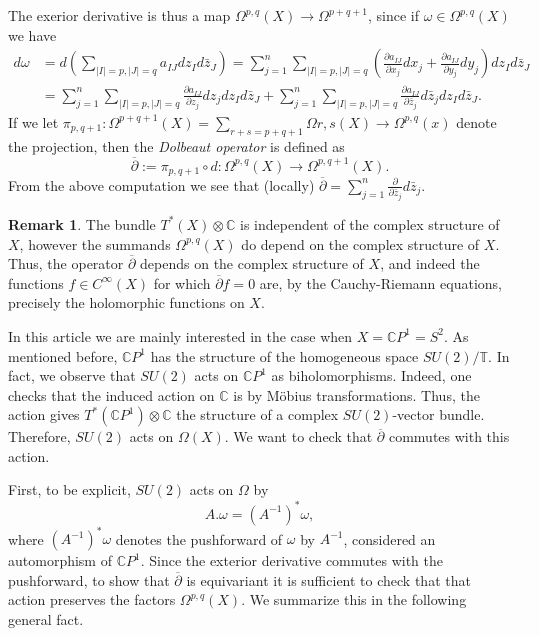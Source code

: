 \documentclass[12pt]{article}
\theoremstyle{definition}
\newtheorem*{rem}{Remark}
\newcommand{\C}{\mathbb{C}}
\newcommand{\T}{\mathbb{T}}
\newcommand{\dolb}{\overline{\partial}}
\begin{document}
The exerior derivative is thus a map $\Omega^{p,q}(X) \to \Omega^{p+q+1}$, since if $\omega \in \Omega^{p,q}(X)$ we have 
	\begin{align*}
		d\omega & = d\left(\sum_{|I|=p, |J|=q}a_{IJ}dz_Id\bar{z}_J\right) = \sum_{j=1}^n\sum_{|I|=p, |J|=q}\left(\frac{\partial a_{IJ}}{\partial x_j}dx_j+\frac{\partial a_{IJ}}{\partial y_j}dy_j\right)dz_Id\bar{z}_J \\
		& = \sum_{j=1}^n\sum_{|I|=p, |J|=q}\frac{\partial a_{IJ}}{\partial z_j}dz_jdz_Id\bar{z}_J+\sum_{j=1}^n\sum_{|I|=p, |J|=q}\frac{\partial a_{IJ}}{\partial \bar{z}_j}d\bar{z}_jdz_Id\bar{z}_J.
	\end{align*}
If we let $\pi_{p,q+1}:\Omega^{p+q+1}(X) = \sum_{r+s=p+q+1}\Omega{r,s}(X)\to \Omega^{p,q}(x)$ denote the projection, then the \textit{Dolbeaut operator} is defined as 
	\[\dolb:= \pi_{p,q+1}\circ d : \Omega^{p,q}(X) \to \Omega^{p,q+1}(X). \]
From the above computation we see that (locally) $\dolb = \sum_{j=1}^n\frac{\partial}{\partial\bar{z}_j}d\bar{z}_j$.

\begin{rem}
	The bundle $T^*(X)\otimes \C$ is independent of the complex structure of $X$, however the summands $\Omega^{p,q}(X)$ do depend on the complex structure of $X$. Thus, the operator $\dolb$ depends on the complex structure of $X$, and indeed the functions $f\in C^\infty(X)$ for which $\dolb f = 0$ are, by the Cauchy-Riemann equations, precisely the holomorphic functions on $X$. 
\end{rem}

In this article we are mainly interested in the case when $X=\C P^1 = S^2$. As mentioned before, $\C P^1$ has the structure of the homogeneous space $SU(2)/\T$. In fact, we observe that $SU(2)$ acts on $\C P^1$ as biholomorphisms. Indeed, one checks that the induced action on $\C$ is by M\"{o}bius transformations. Thus, the action gives $T^*(\C P^1)\otimes \C$ the structure of a complex $SU(2)$-vector bundle. Therefore, $SU(2)$ acts on $\Omega(X)$. We want to check that $\dolb$ commutes with this action.  

First, to be explicit, $SU(2)$ acts on $\Omega$ by 
	\[A.\omega = (A^{-1})^*\omega, \]
where $(A^{-1})^*\omega$ denotes the pushforward of $\omega$ by $A^{-1}$, considered an automorphism of $\C P^1$. Since the exterior derivative commutes with the pushforward, to show that $\dolb$ is equivariant it is sufficient to check that that action preserves the factors $\Omega^{p,q}(X)$. We summarize this in the following general fact. 
\end{document}
